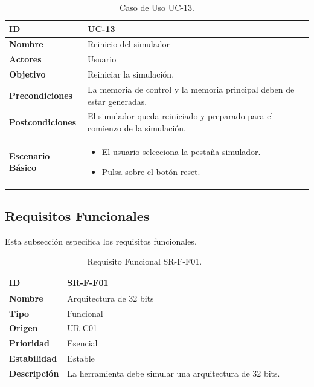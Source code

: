 \begin{center}
\begin{table}[htbp]
\centering
\begin{tabular}{@{}p{2.5cm} p{9cm}@{}} 
\toprule
\textbf{ID}	& UC-13  \\
\midrule
\textbf{Nombre} 		& Reinicio del simulador  \\
\midrule
\textbf{Actores} 		&	Usuario  \\
\midrule
\textbf{Objetivo} 	&	Reiniciar la simulación.	 \\
\midrule
\textbf{Precondiciones}	&	La memoria de control y la memoria principal deben de estar generadas.  \\
\midrule
\textbf{Postcondiciones} 	& El simulador queda reiniciado y preparado para el comienzo de la simulación.   \\
\midrule
\textbf{Escenario Básico} 	&  \begin{itemize}
\item El usuario selecciona la pestaña simulador.
\item Pulsa sobre el botón reset.
\end{itemize} \\
\bottomrule
\end{tabular}
\caption{Caso de Uso UC-13.}
\label{tab:uc13}
\end{table}
\end{center}


\clearpage
\subsection{Requisitos Funcionales}

Esta subsección especifica los requisitos funcionales.

\begin{center}
\begin{table}[htbp]
\centering
\begin{tabular}{@{}p{2.5cm} p{9cm}@{}} 
\toprule
\textbf{ID} 				& SR-F-F01 \\
\midrule
\textbf{Nombre} 			& Arquitectura de 32 bits \\
\midrule
\textbf{Tipo} 			& Funcional \\
\midrule
\textbf{Origen} 			& UR-C01 \\
\midrule
\textbf{Prioridad}		& Esencial \\
\midrule
\textbf{Estabilidad} 		& Estable \\
\midrule
\textbf{Descripción} 	& La herramienta debe simular una arquitectura de 32 bits. \\
\bottomrule
\end{tabular}
\caption{Requisito Funcional SR-F-F01.}
\label{tab:srff01}
\end{table}
\end{center}

